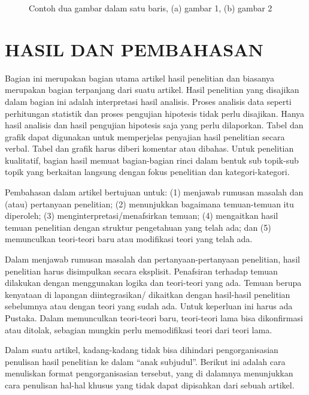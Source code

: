 \documentclass{iaesarticle-progres}
\begin{document}
\begin{figure}[H]
{\begin{minipage}[c][1.2\width]{0.3\textwidth}
	\end{minipage}}
	\vspace{.7em}
\caption{Contoh dua gambar dalam satu baris, \linebreak (a) gambar 1, (b) gambar 2}
\label{fig:my_gambar2}
\end{figure}


\section{HASIL DAN PEMBAHASAN}
\label{hasil}
Bagian ini merupakan bagian utama artikel hasil penelitian dan biasanya merupakan bagian terpanjang dari suatu artikel. Hasil penelitian yang disajikan dalam bagian ini adalah interpretasi hasil analisis. Proses analisis data seperti perhitungan statistik dan proses pengujian hipotesis tidak perlu disajikan. Hanya hasil analisis dan hasil pengujian hipotesis saja yang perlu dilaporkan. Tabel dan grafik dapat digunakan untuk memperjelas penyajian hasil penelitian secara verbal. Tabel dan grafik harus diberi komentar atau dibahas.
Untuk penelitian kualitatif, bagian hasil memuat bagian-bagian rinci dalam bentuk sub topik-sub topik yang berkaitan langsung dengan fokus penelitian dan kategori-kategori.

Pembahasan dalam artikel bertujuan untuk: (1) menjawab rumusan masalah dan (atau) pertanyaan penelitian; (2) menunjukkan bagaimana temuan-temuan itu diperoleh; (3) menginterpretasi/menafsirkan temuan; (4) mengaitkan hasil temuan penelitian dengan struktur pengetahuan yang telah ada; dan (5) memunculkan teori-teori baru atau modifikasi teori yang telah ada.

Dalam menjawab rumusan masalah dan pertanyaan-pertanyaan penelitian, hasil penelitian harus disimpulkan secara eksplisit. Penafsiran terhadap temuan dilakukan dengan menggunakan logika dan teori-teori yang ada. Temuan berupa kenyataan di lapangan diintegrasikan/ dikaitkan dengan hasil-hasil penelitian sebelumnya atau dengan teori yang sudah ada. Untuk keperluan ini harus ada Pustaka. Dalam memunculkan teori-teori baru, teori-teori lama bisa dikonfirmasi atau ditolak, sebagian mungkin perlu memodifikasi teori dari teori lama.

Dalam suatu artikel, kadang-kadang tidak bisa dihindari pengorganisasian penulisan hasil penelitian ke dalam “anak subjudul”. Berikut ini adalah cara menuliskan format pengorganisasian tersebut, yang di dalamnya menunjukkan cara penulisan hal-hal khusus yang tidak dapat dipisahkan dari sebuah artikel.
\end{document}
